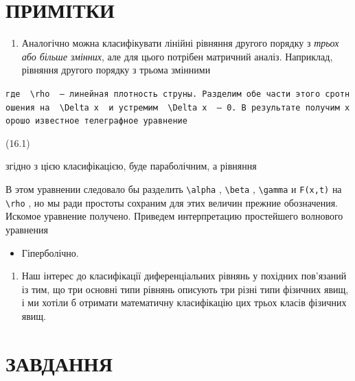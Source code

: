 \documentclass[
  ukrainian,
]{article}
\providecommand{\tightlist}{%
  \setlength{\itemsep}{0pt}\setlength{\parskip}{0pt}}
\begin{document}
\section{ПРИМІТКИ}\label{ux43fux440ux438ux43cux456ux442ux43aux438-1}

\begin{enumerate}
\def\labelenumi{\arabic{enumi}.}
\tightlist
\item
  Аналогічно можна класифікувати лінійні рівняння другого порядку з
  \emph{трьох або більше змінних}, але для цього потрібен матричний
  аналіз. Наприклад, рівняння другого порядку з трьома змінними
\end{enumerate}

\texttt{где\ \ \textquotesingle{}\textbackslash{}rho\textquotesingle{}\ \ —\ линейная\ плотность\ струны.\ Разделим\ обе\ части\ этого\ сротношения\ на\ \ \textquotesingle{}\textbackslash{}Delta\ x\textquotesingle{}\ \ и\ устремим\ \ \textquotesingle{}\textbackslash{}Delta\ x\textquotesingle{}\ \ —\ 0.\ В\ результате\ получим\ хорошо\ известное\ телеграфное\ уравнение}

(16.1)

згідно з цією класифікацією, буде параболічним, а рівняння

В этом уравнении следовало бы разделить \texttt{\textbackslash{}alpha} ,
\texttt{\textbackslash{}beta} , \texttt{\textbackslash{}gamma} и
\texttt{F(x,t)} на \texttt{\textbackslash{}rho} , но мы ради простоты
сохраним для этих величин прежние обозначения. Искомое уравнение
получено. Приведем интерпретацию простейшего волнового уравнения

\begin{itemize}
\tightlist
\item
  Гіперболічно.
\end{itemize}

\begin{enumerate}
\def\labelenumi{\arabic{enumi}.}
\setcounter{enumi}{1}
\tightlist
\item
  Наш інтерес до класифікації диференціальних рівнянь у похідних
  пов'язаний із тим, що три основні типи рівнянь описують три різні типи
  фізичних явищ, і ми хотіли б отримати математичну класифікацію цих
  трьох класів фізичних явищ.
\end{enumerate}

\section{ЗАВДАННЯ}\label{ux437ux430ux432ux434ux430ux43dux43dux44f-2}
\end{document}
